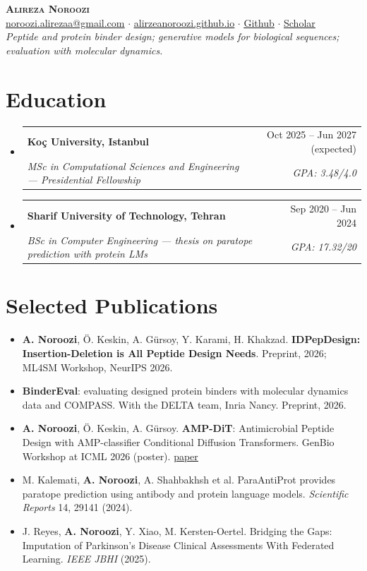 \documentclass[letterpaper,10pt]{article}
\makeatletter
\newcommand{\resumeItem}[1]{\item\small{#1\vspace{-3pt}}}
\newcommand{\resumeSubheading}[4]{
  \vspace{-3pt}\item
    \begin{tabular*}{0.97\textwidth}[t]{l@{\extracolsep{\fill}}r}
      \textbf{#1} & #2 \\
      \textit{\small#3} & \textit{\small #4} \\
    \end{tabular*}\vspace{-8pt}
}
\newcommand{\resumeSubHeadingListStart}{\begin{itemize}[leftmargin=0.15in, label={}]}
\newcommand{\resumeSubHeadingListEnd}{\end{itemize}}
\newcommand{\resumeItemListStart}{\begin{itemize}[topsep=1pt, itemsep=0pt, parsep=0pt]}
\newcommand{\resumeItemListEnd}{\end{itemize}\vspace{-6pt}}
\makeatother
\begin{document}
\vspace*{10pt}
\begin{center}
    \textbf{\LARGE \scshape Alireza Noroozi} \\ \vspace{3pt}
    \small
    \href{mailto:noroozi.alirezaa@gmail.com}{\underline{noroozi.alirezaa@gmail.com}}
    $\cdot$
    \href{https://alirzeanoroozi.github.io/}{\underline{alirzeanoroozi.github.io}}
    $\cdot$
    \href{https://github.com/Alirzeanoroozi}{\underline{Github}}
    $\cdot$
    \href{https://scholar.google.com/citations?user=CzouC0IAAAAJ\&hl=en}{\underline{Scholar}}
    \\ \vspace{3pt}
    \small\emph{Peptide and protein binder design; generative models for biological sequences; evaluation with molecular dynamics.}
\end{center}

\section{Education}
  \resumeSubHeadingListStart
    \resumeSubheading
      {Ko\c{c} University, Istanbul}{Oct 2025 -- Jun 2027 (expected)}
      {MSc in Computational Sciences and Engineering --- Presidential Fellowship}{GPA: 3.48/4.0}
    \resumeSubheading
      {Sharif University of Technology, Tehran}{Sep 2020 -- Jun 2024}
      {BSc in Computer Engineering --- thesis on paratope prediction with protein LMs}{GPA: 17.32/20}
  \resumeSubHeadingListEnd

\section{Selected Publications}
    \resumeItemListStart
        \resumeItem{\textbf{A. Noroozi}, \"{O}. Keskin, A. G\"{u}rsoy, Y. Karami, H. Khakzad. \textbf{IDPepDesign: Insertion-Deletion is All Peptide Design Needs}. Preprint, 2026; ML4SM Workshop, NeurIPS 2026.}
        \resumeItem{\textbf{BinderEval}: evaluating designed protein binders with molecular dynamics data and COMPASS. With the DELTA team, Inria Nancy. Preprint, 2026.}
        \resumeItem{\textbf{A. Noroozi}, \"{O}. Keskin, A. G\"{u}rsoy. \textbf{AMP-DiT}: Antimicrobial Peptide Design with AMP-classifier Conditional Diffusion Transformers. GenBio Workshop at ICML 2026 (poster). \href{https://openreview.net/forum?id=KYzd6lcfZ0}{\underline{paper}}}
        \resumeItem{M. Kalemati, \textbf{A. Noroozi}, A. Shahbakhsh et al. ParaAntiProt provides paratope prediction using antibody and protein language models. \emph{Scientific Reports} 14, 29141 (2024).}
        \resumeItem{J. Reyes, \textbf{A. Noroozi}, Y. Xiao, M. Kersten-Oertel. Bridging the Gaps: Imputation of Parkinson's Disease Clinical Assessments With Federated Learning. \emph{IEEE JBHI} (2025).}
    \resumeItemListEnd
\end{document}

